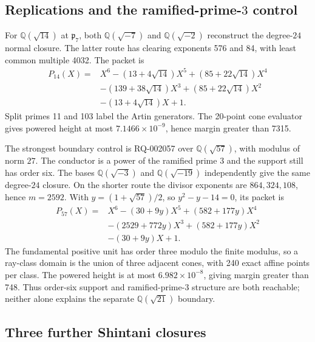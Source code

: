 \documentclass[11pt]{article}
\newcommand{\Q}{\mathbb Q}
\begin{document}
\subsection{Replications and the
\texorpdfstring{ramified-prime-\(3\)}{ramified-prime-3} control}

For \(\Q(\sqrt{14})\) at \(\mathfrak p_7\), both
\(\Q(\sqrt{-7})\) and \(\Q(\sqrt{-2})\) reconstruct the degree-$24$
normal closure.  The latter route has clearing exponents 576 and 84,
with least common multiple 4032.  The packet is
\begin{equation}\label{eq:packet-q14}
\begin{aligned}
P_{14}(X)={}&X^6-(13+4\sqrt{14})X^5
 +(85+22\sqrt{14})X^4\\
&-(139+38\sqrt{14})X^3
 +(85+22\sqrt{14})X^2\\
&-(13+4\sqrt{14})X+1.
\end{aligned}
\end{equation}
Split primes 11 and 103 label the Artin generators.  The 20-point
cone evaluator gives powered height at most
\(7.1466\times10^{-9}\), hence margin greater than 7315.

The strongest boundary control is RQ-002057 over
\(\Q(\sqrt{57})\), with modulus of norm \(27\).  The conductor is a
power of the ramified prime 3 and the support still has order six.
The bases \(\Q(\sqrt{-3})\) and \(\Q(\sqrt{-19})\) independently
give the same degree-$24$ closure.  On the shorter route the divisor
exponents are \(864,324,108\), hence \(m=2592\).
With \(y=(1+\sqrt{57})/2\), so \(y^2-y-14=0\), its packet is
\begin{equation}\label{eq:packet-q57}
\begin{aligned}
P_{57}(X)={}&X^6-(30+9y)X^5+(582+177y)X^4\\
&-(2529+772y)X^3+(582+177y)X^2\\
&-(30+9y)X+1.
\end{aligned}
\end{equation}
The fundamental positive unit has order three modulo the finite
modulus, so a ray-class domain is the union of three adjacent cones,
with 240 exact affine points per class.  The powered height is at most
\(6.982\times10^{-8}\), giving margin greater than 748.  Thus
order-six support and ramified-prime-$3$ structure are both
reachable; neither alone explains the separate
\(\Q(\sqrt{21})\) boundary.

\subsection{Three further Shintani closures}
\end{document}
